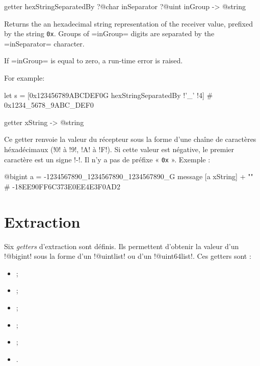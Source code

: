 
\begin{galgas3box}
getter hexStringSeparatedBy ?@char inSeparator ?@uint inGroup -> @string
\end{galgas3box}

Returns the an hexadecimal string representation of the receiver value, prefixed by the string \texttt{0x}. Groups of \ggst=inGroup= digits are separated by the \ggst=inSeparator= character.

If \ggst=inGroup= is equal to zero, a run-time error is raised.

For example:
\begin{galgas3}
let s = [0x123456789ABCDEF0G hexStringSeparatedBy !'_' !4] # 0x1234_5678_9ABC_DEF0
\end{galgas3}







\begin{galgas3box}
getter xString -> @string
\end{galgas3box}

Ce getter renvoie la valeur du récepteur sous la forme d'une chaîne de caractères héxadécimaux (\ggst!0! à \ggst!9!, \ggst!A! à \ggst!F!). Si cette valeur est négative, le premier caractère est un signe \ggst!-!. Il n'y a pas de préfixe « \texttt{0x} ». Exemple :

\begin{galgas3}
@bigint a = -1234567890_1234567890_1234567890_G
message [a xString] + "\n" # -18EE90FF6C373E0EE4E3F0AD2
\end{galgas3}









\section{Extraction}

Six \emph{getters} d'extraction sont définis. Ils permettent d'obtenir la valeur d'un \ggst!@bigint! sous la forme d'un \ggst!@uintlist! ou d'un \ggst!@uint64list!. Ces getters sont :
\begin{itemize}
  \item {} ;
  \item {} ;
  \item {} ;
  \item {} ;
  \item {} ;
  \item {}.
\end{itemize}

